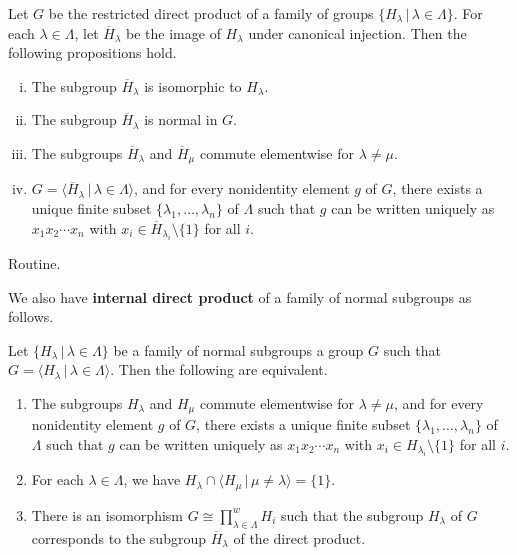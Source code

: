 \begin{proposition}
	Let $G$ be the restricted direct product of a family of groups $\{H_\lambda\,|\, \lambda \in \Lambda\}$. For each $\lambda\in \Lambda$,  let $\overline{H}_\lambda$ be the image of $H_\lambda$ under canonical injection. Then the following propositions hold.
	\begin{enumerate}[(i)]
		\item The subgroup $\overline{H}_\lambda$ is isomorphic to $H_\lambda$.
		\item The subgroup $\overline{H}_\lambda$ is normal in $G$.
		\item The subgroups $\overline{H}_\lambda$ and $\overline{H}_\mu$ commute elementwise for $\lambda \neq \mu$.
		\item $G = \langle \overline{H}_\lambda \,|\, \lambda\in\Lambda \rangle$, and for  every nonidentity element $g$ of $G$, there exists a unique finite subset $\{\lambda_1,\dots, \lambda_n\}$ of $\Lambda$ such that $g$ can be written uniquely as $x_1 x_2 \cdots x_n$ with $x_i \in \overline{H}_{\lambda_i}\setminus\{1\}$ for all $i$.
	\end{enumerate}
\end{proposition}
\begin{sketch}
	Routine.
\end{sketch}
We also have \textbf{internal direct product} of a family of normal subgroups as follows.
\begin{theorem}
	Let $\{H_\lambda\,|\, \lambda \in \Lambda\}$ be a family of normal subgroups a group $G$ such that $G = \langle H_\lambda\,|\, \lambda \in \Lambda \rangle$. Then the following  are equivalent.
	\begin{enumerate}[(1)]
		\item The subgroups $H_\lambda$ and $H_\mu$ commute elementwise for $\lambda\neq \mu$, and for  every nonidentity element $g$ of $G$, there exists a unique finite subset $\{\lambda_1,\dots, \lambda_n\}$ of $\Lambda$ such that $g$ can be written uniquely as $x_1 x_2 \cdots x_n$ with $x_i \in H_{\lambda_i}\setminus\{1\}$ for all $i$.
		\item For each $\lambda\in\Lambda$, we have $H_\lambda \cap \langle H_\mu\,|\, \mu \neq \lambda \rangle= \{1\}$.
		\item There is an isomorphism $G \cong \prod_{\lambda\in \Lambda}^w H_i$ such that the subgroup $H_\lambda$ of $G$ corresponds to the subgroup $\overline{H}_\lambda$ of the direct product.
	\end{enumerate}
\end{theorem}
